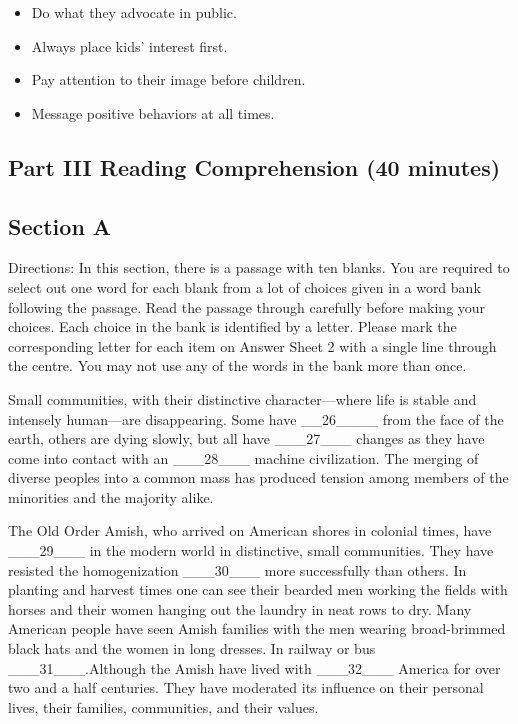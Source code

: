 \documentclass[UTF8,11pt]{ctexart}
\begin{document}
\begin{itemize}[leftmargin=2em,itemsep=.2em,topsep=.4em]\item[A.] Do what they advocate in public.
\item[B.] Always place kids' interest first.
\item[C.] Pay attention to their image before children.
\item[D.] Message positive behaviors at all times.
\end{itemize}

\subsection*{Part III Reading Comprehension (40 minutes)}


\subsection*{Section A}


Directions: In this section, there is a passage with ten blanks. You are required to select out one word for each blank from a lot of choices given in a word bank following the passage. Read the passage through carefully before making your choices. Each choice in the bank is identified by a letter. Please mark the corresponding letter for each item on Answer Sheet 2 with a single line through the centre. You may not use any of the words in the bank more than once.


Small communities, with their distinctive character—where life is stable and intensely human—are disappearing. Some have \_\_26\_\_\_\_ from the face of the earth, others are dying slowly, but all have \_\_\_27\_\_\_ changes as they have come into contact with an \_\_\_28\_\_\_ machine civilization. The merging of diverse peoples into a common mass has produced tension among members of the minorities and the majority alike.


The Old Order Amish, who arrived on American shores in colonial times, have \_\_\_29\_\_\_ in the modern world in distinctive, small communities. They have resisted the homogenization \_\_\_30\_\_\_ more successfully than others. In planting and harvest times one can see their bearded men working the fields with horses and their women hanging out the laundry in neat rows to dry. Many American people have seen Amish families with the men wearing broad-brimmed black hats and the women in long dresses. In railway or bus \_\_\_31\_\_\_.Although the Amish have lived with \_\_\_32\_\_\_ America for over two and a half centuries. They have moderated its influence on their personal lives, their families, communities, and their values.
\end{document}
